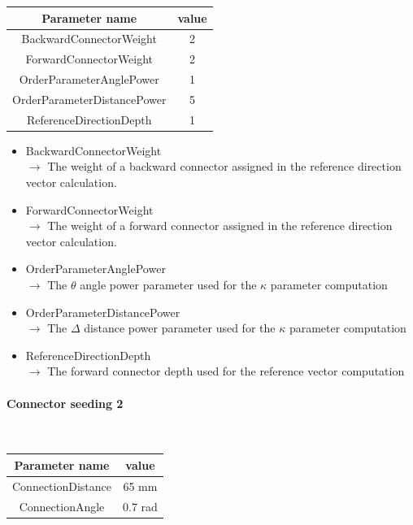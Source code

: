 \documentclass[12pt]{article}
\begin{document}
\begin{table}[!ht]
  \begin{center}
    \begin{tabu} to \linewidth { c | c } 
          Parameter name & value \\
          \hline
          BackwardConnectorWeight & 2 \\
          ForwardConnectorWeight & 2 \\
          OrderParameterAnglePower & 1 \\
          OrderParameterDistancePower & 5 \\
          ReferenceDirectionDepth & 1
    \end{tabu} 
  \end{center}
\end{table}

\begin{itemize}
  \item BackwardConnectorWeight \\
  $\rightarrow$ The weight of a backward connector assigned in the reference direction vector calculation.
  \item ForwardConnectorWeight \\
  $\rightarrow$ The weight of a forward connector assigned in the reference direction vector calculation.
  \item OrderParameterAnglePower \\
  $\rightarrow$ The $\theta$ angle power parameter used for the $\kappa$ parameter computation
  \item OrderParameterDistancePower \\
  $\rightarrow$ The $\Delta$ distance power parameter used for the $\kappa$ parameter computation
  \item ReferenceDirectionDepth \\
  $\rightarrow$ The forward connector depth used for the reference vector computation
\end{itemize}


\paragraph{Connector seeding 2} ~

\begin{table}[!ht]
  \begin{center}
    \begin{tabu} to \linewidth { c | c } 
          Parameter name & value \\
          \hline
          ConnectionDistance & 65 mm \\
          ConnectionAngle & 0.7 rad
    \end{tabu} 
  \end{center}
\end{table}
\end{document}
